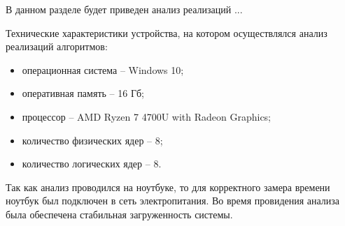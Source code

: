 \label{cha:R}
В данном разделе будет приведен анализ реализаций ...

Технические характеристики устройства, на котором осуществлялся анализ реализаций алгоритмов:
\begin{itemize}
	\item операционная система -- Windows 10;
	\item оперативная память -- 16 Гб;
	\item процессор -- AMD Ryzen 7 4700U with Radeon Graphics;
	\item количество физических ядер -- 8;
	\item количество логических ядер -- 8.
\end{itemize}

Так как анализ проводился на ноутбуке, то для корректного замера времени ноутбук был подключен в сеть электропитания. Во время провидения анализа была обеспечена стабильная загруженность системы.


